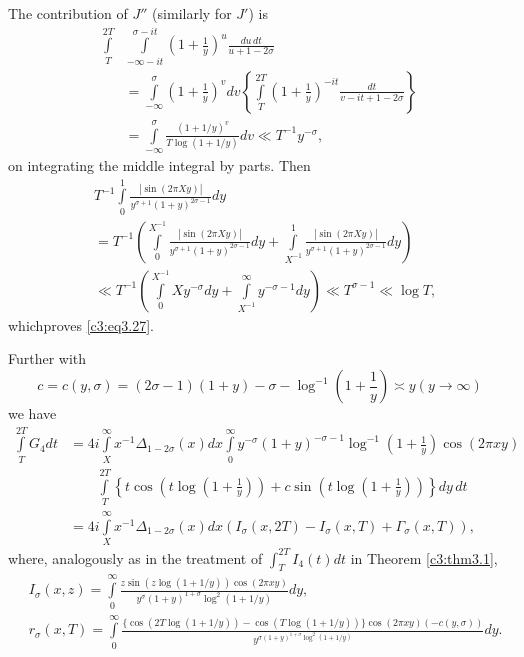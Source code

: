 The contribution of $J''$ (similarly for $J'$) is 
\begin{align*}
  \int\limits_T^{2T} & \int\limits_{- \infty - it}^{\sigma-it} \left(1+
  \frac{1}{y} \right)^u \frac{du \, dt}{u+1 - 2\sigma}\\ 
  & =
  \int\limits_{- \infty}^\sigma \left(1+ \frac{1}{y} \right)^v dv
  \left\{\int\limits_T^{2T} \left(1+ \frac{1}{y} \right)^{-it}
  \frac{dt}{v- it + 1- 2 \sigma} \right\} \\
  & = \int\limits_{- \infty}^\sigma \frac{(1+ 1/y)^v}{T\log (1+
    1/y)}dv \ll T^{-1} y^{-\sigma},
\end{align*}
on integrating the middle integral by parts. Then
\begin{align*}
  & T^{-1} \int\limits_0^1 \frac{|\sin (2 \pi Xy)|}{y^{\sigma+1} (1+
    y)^{2 \sigma -1}} dy\\
  & = T^{-1}\left(\int\limits_0^{X^{-1}} \frac{|\sin (2 \pi X
    y)|}{y^{\sigma+1} (1+ y)^{2 \sigma-1}} dy+ \int\limits_{X^{-1}}^1
  \frac{|\sin (2 \pi Xy)|}{y^{\sigma+1} (1+ y)^{2 \sigma-1}}
  dy\right)\\
  & \ll T^{-1} \left(\int\limits_0^{X^{-1}} Xy^{-\sigma} dy +
  \int\limits_{X^{-1}}^\infty y^{- \sigma-1}dy \right) \ll
  T^{\sigma-1} \ll \log T,
\end{align*}
which\pageoriginale proves \eqref{c3:eq3.27}. 

Further with 
$$
c= c(y, \sigma)= (2 \sigma -1) (1+ y)- \sigma - \log^{-1} \left(1+ 
\frac{1}{y} \right) \asymp y (y \to \infty) 
$$
we have
{\fontsize{10}{12}\selectfont
\begin{align*}
  \int\limits_T^{2T} G_4 dt & = 4i \int\limits_X^\infty x^{-1}
  \Delta_{1- 2 \sigma} (x) dx \int\limits_0^\infty y^{- \sigma} (1+
  y)^{- \sigma -1} \log^{-1} \left( 1+ \frac{1}{y}\right) \cos (2 \pi
  x y)\\ 
  &\qquad \int\limits_T^{2T} \left\{ t \cos \left(t \log \left(1+ \frac{1}{y}
  \right)\right) +  c \sin \left(t \log \left(1+ \frac{1}{y} \right)
  \right) \right\}dy\, dt\\
  & = 4i \int\limits_X^\infty x^{-1} \Delta_{1- 2 \sigma} (x) dx
  (I_\sigma (x, 2T)- I_\sigma (x, T) + \Gamma_\sigma (x, T)),
\end{align*}}
where, analogously as in the treatment of $\int_T^{2T} I_4 (t) dt$ in
Theorem \ref{c3:thm3.1}, 
{\fontsize{9pt}{11pt}\selectfont
\begin{align*}
  & I_\sigma (x, z)  = \int\limits_0^\infty \frac{z\sin (z \log
    (1+1/y)) \cos (2 \pi xy)}{y^\sigma (1+ y)^{1+ \sigma} \log^2 (1+
    1/y)} dy, \\
  & r_\sigma (x, T)  =  \int\limits_{0}^\infty \frac{\{ \cos (2T \log
    (1+ 1/y)) - \cos (T \log (1+ 1/y))\} \cos (2 \pi xy)(-c (y,
    \sigma))}{y^{\sigma (1+ y)^{1+ \sigma} \log^2 (1+ 1/y)}} dy. 
\end{align*}}

